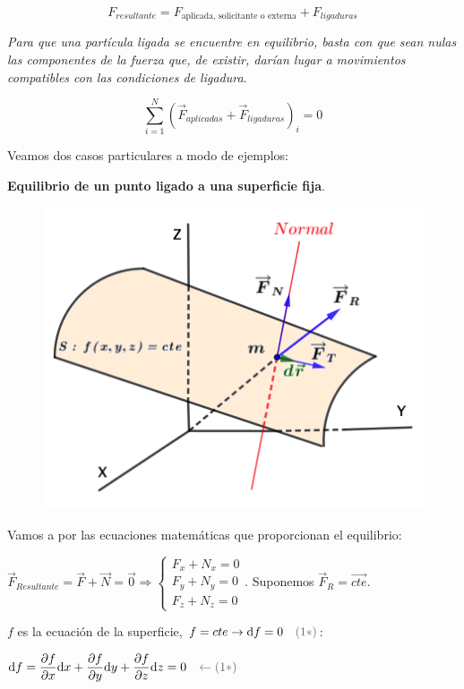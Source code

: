 \vspace{-3mm}$$F_{resultante}=F_{\text{aplicada, solicitante o externa}}+F_{ligaduras}$$

\vspace{-3mm}\emph{Para que una partícula ligada se encuentre en equilibrio, basta con que sean nulas las componentes de la fuerza que, de existir, darían lugar a movimientos compatibles con las condiciones de ligadura}.

\vspace{-3mm}$$\displaystyle \sum_{i=1}^N (\overrightarrow{F}_{aplicadas}+\overrightarrow{F}_{ligaduras})_i=0$$

\vspace{-3mm}Veamos dos casos particulares a modo de ejemplos:

\begin{ejem}
\textbf{Equilibrio de un punto ligado a una superficie fija}.	
\end{ejem}
\begin{figure}[H]
	\centering
	\includegraphics[width=.75\textwidth]{imagenes/imagenes05/T05IM04.png}
\end{figure}
Vamos a por las ecuaciones matemáticas que proporcionan el equilibrio:

$\overrightarrow{F}_{Resultante}= \overrightarrow{F}+\overrightarrow{N}=\vec 0 \Rightarrow \begin{cases} F_x+N_x=0\\F_y+N_y=0\\F_z+N_z=0\end{cases}$. Suponemos $\overrightarrow{F}_R=\overrightarrow{cte}$.

$f$ es la ecuación de la superficie, $f=cte \to \dd f=0 \quad \textcolor{gris}{(1*)}$:

$\displaystyle \dd f=\pdv{f}{x} \dd x+\pdv{f}{y} \dd y+\pdv{f}{z} \dd z=0\quad \textcolor{gris}{\leftarrow (1*)}$

